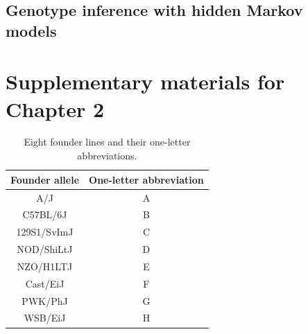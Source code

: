 \documentclass[oneside]{book}\usepackage[]{graphicx}\usepackage[]{color}
\begin{document}
\begin{appendices}
\section{Genotype inference with hidden Markov models}\label{sec:genotypes-hmm}







\chapter{Supplementary materials for Chapter 2}\label{sec:ch2-supp}



\begin{table}
  \caption{Eight founder lines and their one-letter abbreviations.}
  \label{table-letters}
\begin{center}
\small
  \begin{tabular}{ c | c }
    \hline
    Founder allele & One-letter abbreviation \\ \hline
    A/J & A \\
    C57BL/6J & B \\
    129S1/SvImJ & C \\
    NOD/ShiLtJ & D\\
    NZO/H1LTJ & E\\
    Cast/EiJ & F\\
    PWK/PhJ & G\\
    WSB/EiJ & H\\
    \hline
  \end{tabular}

\end{center}
  \end{table}

\clearpage


\end{appendices}
\end{document}
